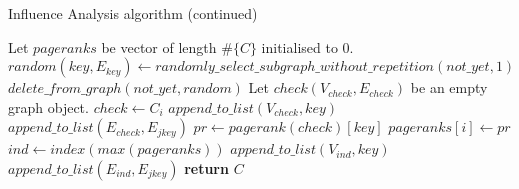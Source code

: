 \documentclass[a4paper]{article}
\begin{document}
\clearpage

\begin{algorithm}
\ContinuedFloat
\caption{Influence Analysis algorithm (continued)}
\begin{algorithmic}[1]
    \State Let $pageranks$ be vector of length $\#\{C\}$ initialised to $0$.
        \State $random(key, E_{key}) \gets randomly\_select\_subgraph\_without\_repetition(not\_yet, 1)$
        \State $delete\_from\_graph(not\_yet, random)$
            \State Let $check(V_{check}, E_{check})$ be an empty graph object.
            \State $check \gets C_i$
            \State $append\_to\_list(V_{check}, key)$
                    \State $append\_to\_list(E_{check}, E_{jkey})$
                \EndIf \label{ia_V_joendif}
            \EndFor \label{ia_E_jkeyendfor}
            \State $pr \gets pagerank(check)[key]$
            \State $pageranks[i] \gets pr$
        \EndFor \label{ia_C_iendfor}
            \State $ind \gets index(max(pageranks))$
            \State $append\_to\_list(V_{ind}, key)$
                    \State $append\_to\_list(E_{ind}, E_{jkey})$
                \EndIf \label{ia_V_joendif}
            \EndFor \label{ia_E_jkeyendfor}
        \EndIf \label{ia_sumendif} 
    \EndWhile \label{ia_V_c'endwhile}
    \State \textbf{return} $C$
\EndProcedure
\end{algorithmic}
\end{algorithm}

\end{document}
